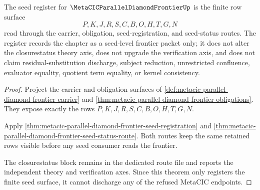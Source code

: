 \begin{theorem}
\label{thm:metacic-parallel-diamond-frontier-seed-register}
The seed register for $\MetaCICParallelDiamondFrontierUp$ is the finite row surface
$$
P,K,J,R,S,C,B,O,H,T,G,N
$$
read through the carrier, obligation, seed-registration, and seed-status routes. The register records the chapter as a seed-level frontier packet only; it does not alter the closurestatus theory axis, does not upgrade the verification axis, and does not claim residual-substitution discharge, subject reduction, unrestricted confluence, evaluator equality, quotient term equality, or kernel consistency.
\end{theorem}
\begin{proof}
Project the carrier and obligation surfaces of \autoref{def:metacic-parallel-diamond-frontier-carrier} and \autoref{thm:metacic-parallel-diamond-frontier-obligations}. They expose exactly the rows $P,K,J,R,S,C,B,O,H,T,G,N$.

Apply \autoref{thm:metacic-parallel-diamond-frontier-seed-registration} and \autoref{thm:metacic-parallel-diamond-frontier-seed-status-route}. Both routes keep the same retained rows visible before any seed consumer reads the frontier.

The closurestatus block remains in the dedicated route file and reports the independent theory and verification axes. Since this theorem only registers the finite seed surface, it cannot discharge any of the refused MetaCIC endpoints.
\end{proof}
